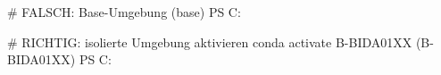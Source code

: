 # FALSCH: Base-Umgebung
(base) PS C:\>

# RICHTIG: isolierte Umgebung aktivieren
conda activate B-BIDA01XX
(B-BIDA01XX) PS C:\>